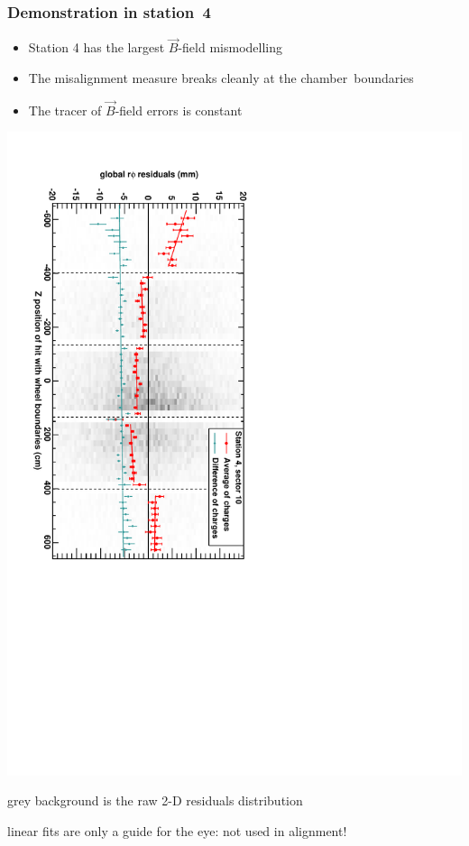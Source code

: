 \documentclass[compress]{beamer}
\begin{document}
\begin{frame}
\frametitle{Demonstration in station~4}
\begin{itemize}
\item Station 4 has the largest $\vec{B}$-field mismodelling
\item The misalignment measure breaks cleanly at the \mbox{chamber boundaries\hspace{-1 cm}}
\item The tracer of $\vec{B}$-field errors is constant
\end{itemize}

\includegraphics[height=\linewidth, angle=90]{demo_of_bfield.pdf}

\scriptsize grey background is the raw 2-D residuals distribution

linear fits are only a guide for the eye: not used in alignment!
\end{frame}
\end{document}
